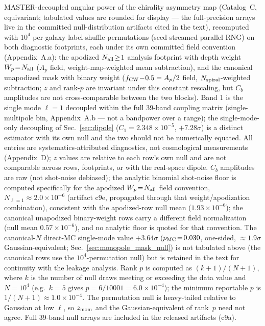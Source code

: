 \documentclass[aps,prd,twocolumn,superscriptaddress,preprintnumbers,nofootinbib,longbibliography,floatfix]{revtex4-2}
\newcommand{\sigmaunit}{\sigma}
\begin{document}
\begin{table}[t]
\caption{MASTER-decoupled angular power of the chirality asymmetry map (Catalog~C, equivariant; tabulated values are rounded for display --- the full-precision arrays live in the committed null-distribution artifacts cited in the text), recomputed with $10^4$ per-galaxy label-shuffle permutations (seed-streamed parallel RNG) on both diagnostic footprints, each under its own committed field convention (Appendix~A.a): the apodized $N_{\rm all}\!\geq\!1$ analysis footprint with depth weight $W_p\!=\!N_{\rm all}$ ($A_p$ field, weight-map-weighted mean subtraction), and the canonical unapodized mask with binary weight ($f_{\rm CW}\!-\!0.5 = A_p/2$ field, $N_{\rm spiral}$-weighted subtraction; $z$ and rank-$p$ are invariant under this constant rescaling, but $C_b$ amplitudes are not cross-comparable between the two blocks). Band 1 is the single mode $\ell\!=\!1$ decoupled within the full 39-band coupling matrix (single-multipole bin, Appendix~A.b --- not a bandpower over a range); the single-mode-only decoupling of Sec.~\ref{sec:dipole} ($C_1\!=\!2.348\!\times\!10^{-5}$, $+7.28\sigmaunit$) is a distinct estimator with its own null and the two should not be numerically equated. All entries are systematics-attributed diagnostics, not cosmological measurements (Appendix~D); $z$ values are relative to each row's own null and are not comparable across rows, footprints, or with the real-space dipole. $C_b$ amplitudes are raw (not shot-noise debiased); the analytic binomial shot-noise floor is computed specifically for the apodized $W_p\!=\!N_{\rm all}$ field convention, $N_{\ell=1}\!\approx\!2.0\!\times\!10^{-6}$ (artifact c9e, propagated through that weight/apodization combination), consistent with the apodized-row null mean ($1.93\!\times\!10^{-6}$); the canonical unapodized binary-weight rows carry a different field normalization (null mean $0.57\!\times\!10^{-6}$), and no analytic floor is quoted for that convention. The canonical-$N$ direct-MC single-mode value $+3.64\sigmaunit$ ($p_{\rm MC}\!=\!0.030$, one-sided, ${\approx}1.9\sigmaunit$ Gaussian-equivalent; Sec.~\ref{sec:monopole_mask_null}) is not tabulated above (the canonical rows use the $10^4$-permutation null) but is retained in the text for continuity with the leakage analysis. Rank $p$ is computed as $(k+1)/(N+1)$, where $k$ is the number of null draws meeting or exceeding the data value and $N\!=\!10^4$ (e.g.\ $k\!=\!5$ gives $p\!=\!6/10001\!=\!6.0\!\times\!10^{-4}$); the minimum reportable $p$ is $1/(N{+}1)\!\approx\!1.0\!\times\!10^{-4}$. The permutation null is heavy-tailed relative to Gaussian at low $\ell$, so $z_{\rm mom}$ and the Gaussian-equivalent of rank~$p$ need not agree. Full 39-band null arrays are included in the released artifacts (c9a).\label{tab:multipole}}

\end{table}
\end{document}
